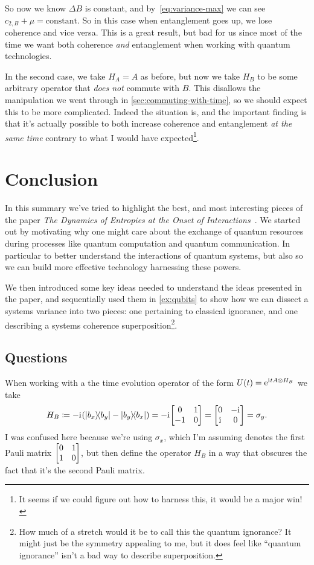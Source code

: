 \documentclass[11pt,english]{article}
\theoremstyle{definition}
\newcommand{\twonormE}[1][\rho]{c_{2,B}}
\newcommand{\iu}{\mathrm{i}\mkern1mu}
\newcommand{\e}{\mathrm{e}}
\begin{document}
So now we know $\Delta B$ is constant, and by~\cref{eq:variance-max} we can see $\twonormE + \mu = \text{constant}$. So in this case when entanglement goes up, we lose coherence and vice versa. This is a great result, but bad for us since most of the time we want both coherence \emph{and} entanglement when working with quantum technologies.

In the second case, we take $H_A = A$ as before, but now we take $H_B$ to be some arbitrary operator that \emph{does not} commute with $B$. This disallows the manipulation we went through in \cref{sec:commuting-with-time}, so we should expect this to be more complicated. Indeed the situation is, and the important finding is that it's actually possible to both increase coherence and entanglement \emph{at the same time} contrary to what I would have expected\footnote{It seems if we could figure out how to harness this, it would be a major win!}.

\section{Conclusion}

In this summary we've tried to highlight the best, and most interesting pieces of the paper \emph{The Dynamics of Entropies at the Onset of Interactions}~\cite{dynamic-entropies}. We started out by motivating why one might care about the exchange of quantum resources during processes like quantum computation and quantum communication. In particular to better understand the interactions of quantum systems, but also so we can build more effective technology harnessing these powers.

We then introduced some key ideas needed to understand the ideas presented in the paper, and sequentially used them in \cref{ex:qubits} to show how we can dissect a systems variance into two pieces: one pertaining to classical ignorance, and one describing a systems coherence superposition\footnote{How much of a stretch would it be to call this the quantum ignorance? It might just be the symmetry appealing to me, but it does feel like ``quantum ignorance'' isn't a bad way to describe superposition.}.

\subsection{Questions}
When working with a the time evolution operator of the form $U(t) = \e^{\iu tA\otimes H_B}$ we take
\begin{equation*}
	H_B \coloneqq -\iu\qty(\ketbra{b_x}{b_y} - \ketbra{b_y}{b_x}) = -\iu\mqty[0 & 1 \\ -1 & 0] = \mqty[0 & -\iu \\ \iu & 0] = \sigma_y.
\end{equation*}
I was confused here because we're using $\sigma_x$, which I'm assuming denotes the first Pauli matrix $\mqty[0 & 1 \\ 1 & 0]$, but then define the operator $H_B$ in a way that obscures the fact that it's the second Pauli matrix.
\end{document}

